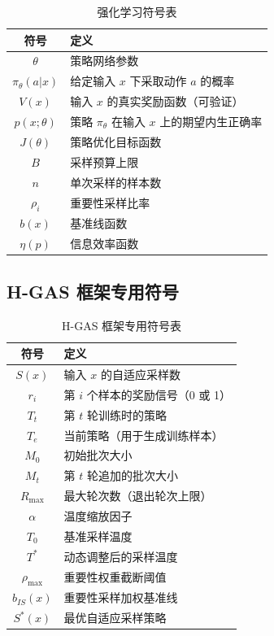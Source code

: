 \begin{table}[htbp]
    \centering
    \caption{强化学习符号表}\label{tab:rl_symbols}
    \begin{tabular}{cl}
    \hline
    \textbf{符号} & \textbf{定义} \\
    \hline
    $\theta$ & 策略网络参数 \\
    $\pi_\theta(a|x)$ & 给定输入 $x$ 下采取动作 $a$ 的概率 \\
    $V(x)$ & 输入 $x$ 的真实奖励函数（可验证） \\
    $p(x;\theta)$ & 策略 $\pi_\theta$ 在输入 $x$ 上的期望内生正确率 \\
    $J(\theta)$ & 策略优化目标函数 \\
    $B$ & 采样预算上限 \\
    $n$ & 单次采样的样本数 \\
    $\rho_i$ & 重要性采样比率 \\
    $b(x)$ & 基准线函数 \\
    $\eta(p)$ & 信息效率函数 \\
    \hline
    \end{tabular}
\end{table}

\subsection{H-GAS 框架专用符号}

\begin{table}[htbp]
    \centering
    \caption{H-GAS 框架专用符号表}\label{tab:hgas_symbols}
    \begin{tabular}{cl}
    \hline
    \textbf{符号} & \textbf{定义} \\
    \hline
    $S(x)$ & 输入 $x$ 的自适应采样数 \\
    $r_i$ & 第 $i$ 个样本的奖励信号（0 或 1） \\
    $T_t$ & 第 $t$ 轮训练时的策略 \\
    $T_e$ & 当前策略（用于生成训练样本） \\
    $M_0$ & 初始批次大小 \\
    $M_t$ & 第 $t$ 轮追加的批次大小 \\
    $R_{\max}$ & 最大轮次数（退出轮次上限） \\
    $\alpha$ & 温度缩放因子 \\
    $T_0$ & 基准采样温度 \\
    $T^*$ & 动态调整后的采样温度 \\
    $\rho_{\max}$ & 重要性权重截断阈值 \\
    $b_{IS}(x)$ & 重要性采样加权基准线 \\
    $S^*(x)$ & 最优自适应采样策略 \\
    \hline
    \end{tabular}
\end{table}

